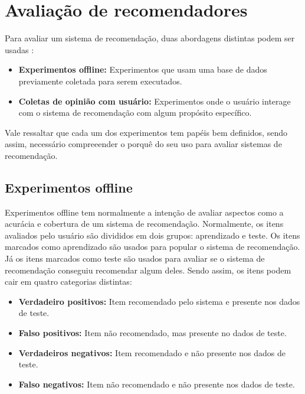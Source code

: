 \section{Avaliação de recomendadores}

Para avaliar um sistema de recomendação, duas abordagens distintas podem ser
usadas \cite{herlocker2004evaluating}:

\begin{itemize}
    \item \textbf{Experimentos offline: } Experimentos que usam uma base de
        dados previamente coletada para serem executados.
    \item \textbf{Coletas de opinião com usuário: } Experimentos onde o usuário
        interage com o sistema de recomendação com algum propósito específico.
\end{itemize}

Vale ressaltar que cada um dos experimentos tem papéis bem definidos, sendo
assim, necessário compreeender o porquê do seu uso para avaliar sistemas de
recomendação.

\subsection{Experimentos offline} \label{sec:rec_experimentos_offline}

Experimentos offline tem normalmente a intenção de avaliar aspectos como a
acurácia e cobertura de um sistema de recomendação. Normalmente, os itens
avaliados pelo usuário são divididos em dois grupos: aprendizado e teste. Os
itens marcados como aprendizado são usados para popular o sistema de
recomendação. Já os itens marcados como teste são usados para avaliar se o
sistema de recomendação conseguiu recomendar algum deles. Sendo assim, os itens
podem cair em quatro categorias distintas:

\begin{itemize}
    \item \textbf{Verdadeiro positivos: } Item recomendado pelo sistema e
        presente nos dados de teste.
    \item \textbf{Falso positivos: } Item não recomendado, mas presente no dados
        de teste.
    \item \textbf{Verdadeiros negativos: } Item recomendado e não presente
        nos dados de teste.
    \item \textbf{Falso negativos: } Item não recomendado e não presente nos
        dados de teste.
\end{itemize}

